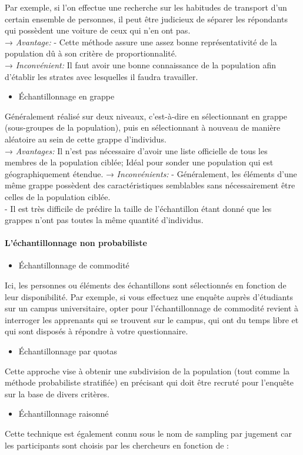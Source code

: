 Par exemple, si l’on effectue une recherche sur les habitudes de transport d’un certain ensemble de personnes, il peut être judicieux de séparer les répondants qui possèdent une voiture de ceux qui n’en ont pas.\\
	→ \textit{Avantage:} - Cette méthode assure une assez bonne représentativité de la population  dû à son critère de proportionnalité.\\
	→ \textit{Inconvénient:} Il faut avoir une bonne connaissance de la population afin d'établir les strates avec lesquelles il faudra travailler.
	\begin{itemize}
		\item	Échantillonnage en grappe 
	\end{itemize}
Généralement réalisé sur deux niveaux, c’est-à-dire en sélectionnant en grappe (sous-groupes de la population), puis en sélectionnant à nouveau de manière aléatoire au sein de cette grappe d’individus. \\
	→ \textit{Avantages: } Il n’est pas nécessaire d’avoir une liste officielle de tous les membres de la population ciblée;
Idéal pour sonder une population qui est géographiquement étendue.
	→ \textit{Inconvénients: } - Généralement, les éléments d’une même grappe possèdent des caractéristiques semblables sans nécessairement être celles de la population ciblée.\\
	- Il est très difficile de prédire la taille de l’échantillon étant donné que les grappes n’ont pas toutes la même quantité d’individus.
	
	\paragraph{L’échantillonnage non probabiliste}
	\begin{itemize}
		\item	Échantillonnage de commodité  
	\end{itemize}
	Ici, les personnes ou éléments des échantillons sont sélectionnés en fonction de leur disponibilité. Par exemple, si vous effectuez une enquête auprès d’étudiants sur un campus universitaire, opter pour l’échantillonnage de commodité revient à interroger les apprenants qui se trouvent sur le campus, qui ont du temps libre et qui sont disposés à répondre à votre questionnaire.
	\begin{itemize}
		\item	Échantillonnage par quotas  
	\end{itemize}
	Cette approche vise à obtenir une subdivision de la population (tout comme la méthode probabiliste stratifiée) en précisant qui doit être recruté pour l’enquête sur la base de divers critères.
	\begin{itemize}
		\item	Échantillonnage raisonné  
	\end{itemize}
	Cette technique est également connu sous le nom de sampling par jugement car les participants sont choisis par les chercheurs en fonction de : 
	
